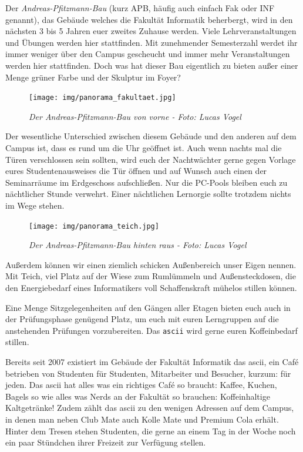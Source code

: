 
Der \emph{Andreas-Pfitzmann-Bau} (kurz APB, häufig auch einfach \glqq{}Fak\grqq{} oder INF genannt), das Gebäude welches die Fakultät Informatik beherbergt, wird in den nächsten 3 bis 5 Jahren euer zweites Zuhause werden.
Viele Lehrveranstaltungen und Übungen werden hier stattfinden. Mit zunehmender Semesterzahl werdet ihr immer weniger über den Campus gescheucht und immer mehr Veranstaltungen werden hier stattfinden.
Doch was hat dieser Bau eigentlich zu bieten außer einer Menge grüner Farbe und der Skulptur im Foyer?

\begin{figure}[h!]
\centering
\texttt{[image: img/panorama\_fakultaet.jpg]}
\caption*{\small \textit{Der Andreas-Pfitzmann-Bau von vorne - Foto: Lucas Vogel}}
\end{figure}

Der wesentliche Unterschied zwischen diesem Gebäude und den anderen auf dem Campus ist, dass es rund um die Uhr geöffnet ist. Auch wenn nachts mal die Türen verschlossen sein sollten, wird euch der Nachtwächter gerne gegen Vorlage eures Studentenausweises die Tür öffnen und auf Wunsch auch einen der Seminarräume im Erdgeschoss aufschließen. Nur die PC-Pools bleiben euch zu nächtlicher Stunde verwehrt.
Einer nächtlichen Lernorgie sollte trotzdem nichts im Wege stehen.

\begin{figure}[h!]
\centering
\texttt{[image: img/panorama\_teich.jpg]}
\caption*{\small \textit{Der Andreas-Pfitzmann-Bau hinten raus - Foto: Lucas Vogel}}
\end{figure}

Außerdem können wir einen ziemlich schicken Außenbereich unser Eigen nennen. Mit Teich, viel Platz auf der Wiese zum Rumlümmeln und Außensteckdosen, die den Energiebedarf eines Informatikers voll Schaffenskraft mühelos stillen können.

Eine Menge Sitzgelegenheiten auf den Gängen aller Etagen bieten euch auch in der Prüfungsphase genügend Platz, um euch mit euren Lerngruppen auf die anstehenden Prüfungen vorzubereiten. Das \texttt{ascii} wird gerne euren Koffeinbedarf stillen.


Bereits seit 2007 existiert im Gebäude der Fakultät Informatik das ascii, ein Café betrieben von Studenten für Studenten, Mitarbeiter und Besucher, kurzum: für jeden.
Das ascii hat alles was ein richtiges Café so braucht: Kaffee, Kuchen, Bagels so wie alles was Nerds an der Fakultät so brauchen: Koffeinhaltige Kaltgetränke!
Zudem zählt das ascii zu den wenigen Adressen auf dem Campus, in denen man neben Club Mate auch Kolle Mate und Premium Cola erhält.
Hinter dem Tresen stehen Studenten, die gerne an einem Tag in der Woche noch ein paar Stündchen ihrer Freizeit zur Verfügung stellen.

